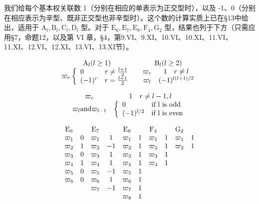 
我们给每个基本权关联数 1（分别在相应的单表示为正交型时），以及 -1、0（分别在相应表示为辛型、既非正交型也非辛型时）。这个数的计算实质上已在§13中给出，适用于 \(\mathrm{A}_l, \mathrm{B}_l, \mathrm{C}_l, \mathrm{D}_l\) 型。对于 \(\mathrm{E}_6, \mathrm{E}_7, \mathrm{E}_8, \mathrm{F}_4, \mathrm{G}_2\) 型，结果也列于下方（只需应用§7，命题12，以及第 VI 章，§4，第9.VI、9.XI、10.VI、10.XI、11.VI、11.XI、12.VI、12.XI、13.VI、13.XI节）。

\[
\begin{array}{c c} \mathrm{A} _ {l} (l \geq 1) & \mathrm{B} _ {l} (l \geq 2) \\ \varpi_ {r} \left\{ \begin{array}{l l} 0 & r \neq \frac {l + 1}{2} \\ (- 1) ^ {r} & r = \frac {l + 1}{2} \end{array} \right. & \begin{array}{c c} \varpi_ {r} & 1 \quad r \neq l \\ \varpi_ {l} & (- 1) ^ {l (l + 1) / 2} \end{array} \end{array}
\]

\[
\begin{array}{c c} \varpi_ {r} & 1 \quad r \neq l - 1, l \\ \varpi_ {l} \text {and} \varpi_ {l - 1} & \left\{ \begin{array}{l l} 0 & \text {if l is odd} \\ (- 1) ^ {l / 2} & \text {if l is even} \end{array} \right. \end{array}
\]

\[
\begin{array}{c c c c c c c c c c} \mathrm{E} _ {6} & & \mathrm{E} _ {7} & & \mathrm{E} _ {8} & & \mathrm{F} _ {4} & & \mathrm{G} _ {2} \\ \varpi_ {1} & 0 & \varpi_ {1} & 1 & \varpi_ {1} & 1 & \varpi_ {1} & 1 & \varpi_ {1} & 1 \\ \varpi_ {2} & 1 & \varpi_ {2} & - 1 & \varpi_ {2} & 1 & \varpi_ {2} & 1 & \varpi_ {2} & 1 \\ \varpi_ {3} & 0 & \varpi_ {3} & 1 & \varpi_ {3} & 1 & \varpi_ {3} & 1 \\ \varpi_ {4} & 1 & \varpi_ {4} & 1 & \varpi_ {4} & 1 & \varpi_ {4} & 1 \\ \varpi_ {5} & 0 & \varpi_ {5} & - 1 & \varpi_ {5} & 1 \\ \varpi_ {6} & 0 & \varpi_ {6} & 1 & \varpi_ {6} & 1 \\ & & \varpi_ {7} & - 1 & \varpi_ {7} & 1 \\ & & & & \varpi_ {8} & 1 \end{array}
\]
\relax{}

